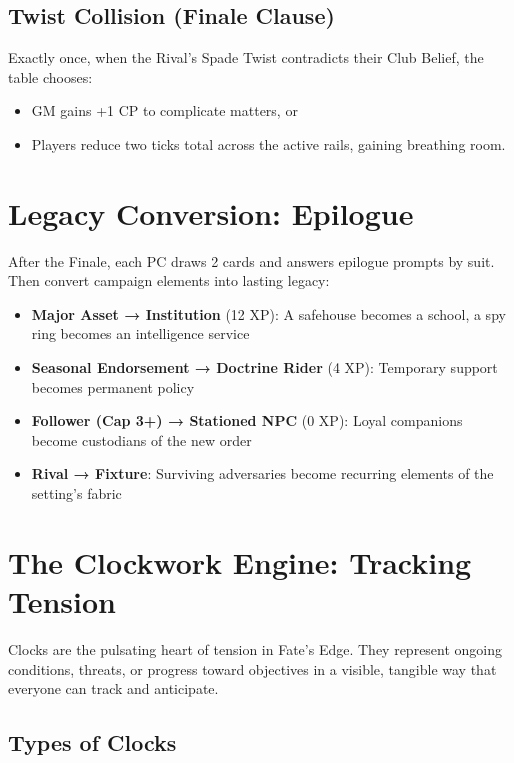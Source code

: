 \subsection*{Twist Collision (Finale Clause)}

Exactly once, when the Rival's Spade Twist contradicts their Club Belief, the table chooses:
\begin{itemize}
    \item GM gains +1 CP to complicate matters, or
    \item Players reduce two ticks total across the active rails, gaining breathing room.
\end{itemize}

\section*{Legacy Conversion: Epilogue}

After the Finale, each PC draws 2 cards and answers epilogue prompts by suit. Then convert campaign elements into lasting legacy:

\begin{itemize}
    \item \textbf{Major Asset → Institution} (12 XP): A safehouse becomes a school, a spy ring becomes an intelligence service
    \item \textbf{Seasonal Endorsement → Doctrine Rider} (4 XP): Temporary support becomes permanent policy
    \item \textbf{Follower (Cap 3+) → Stationed NPC} (0 XP): Loyal companions become custodians of the new order
    \item \textbf{Rival → Fixture}: Surviving adversaries become recurring elements of the setting's fabric
\end{itemize}

\section*{The Clockwork Engine: Tracking Tension}

Clocks are the pulsating heart of tension in Fate's Edge. They represent ongoing conditions, threats, or progress toward objectives in a visible, tangible way that everyone can track and anticipate.

\subsection*{Types of Clocks}

